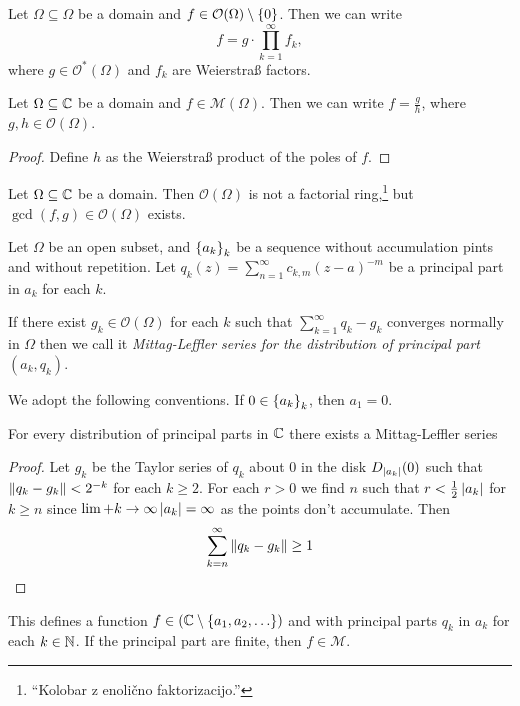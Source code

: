 \begin{izrek}
Let $\Omega \subseteq \Omega$ be a domain and
$f \in \mathcal{O}(\Omega) \setminus \left\{0\right\}$. Then we can write
\[
f = g \cdot \prod_{k=1}^\infty f_k,
\]
where $g \in \mathcal{O}^*(\Omega)$ and $f_k$ are Weierstraß
factors.
\end{izrek}

\obvs

\begin{izrek}
Let $\Omega \subseteq \mathbb{C}$ be a domain and
$f \in \mathcal{M}(\Omega)$. Then we can write $f = \frac{g}{h}$,
where $g, h \in \mathcal{O}(\Omega)$.
\end{izrek}

\begin{proof}
Define $h$ as the Weierstraß product of the poles of $f$.
\end{proof}

\begin{opomba}
Let $\Omega \subseteq \mathbb{C}$ be a domain. Then $\mathcal{O}(\Omega)$
is not a factorial ring,\footnote{``Kolobar z enolično
faktorizacijo.''} but $\gcd(f, g) \in \mathcal{O}(\Omega)$ exists.
\end{opomba}


\begin{definicija}
    Let $\Omega$ be an open subset, and $\left\{a_k\right\}_k$ be a sequence without accumulation pints and without repetition. Let $q_k(z) = \sum_{n=1}^{\infty} c_{k, m} (z - a)^{-m}$ be a principal part in $a_k$ for each $k$.

    If there exist $g_k \in \mathcal{O}(\Omega)$ for each $k$ such that $\sum_{k = 1}^{\infty} q_k - g_k$ converges normally in $\Omega$ then we call it \textit{Mittag-Leffler series for the distribution of principal part $(a_k, q_k)$}.
\end{definicija}
\begin{opomba}
    We adopt the following conventions. If $ 0 \in \left\{a_k\right\}_k$, then $a_1 = 0$.
\end{opomba}

\begin{izrek}
    \label{inf_prod:thr:MLforC}
    For every distribution of principal parts in $\mathbb{C}$ there exists a Mittag-Leffler series
\end{izrek}
\begin{proof}
    Let $g_k$ be the Taylor series of $q_k$ about $0$ in the disk $D_{\left\lvert a_k\right\rvert}(0)$ such that $\left\lVert q_k - g_k\right\rVert < 2^{-k}$ for each $k \geq 2$. For each $r > 0$ we find $n$ such that $r < \frac{1}{2}\left\lvert a_k\right\rvert$ for $k \geq n$ since $\lim+{k \rightarrow \infty} \left\lvert a_k\right\rvert = \infty$ as the points don't accumulate. Then
    $$
        \sum_{k = n}^{\infty} \left\lVert q_k - g_k\right\rVert \geq 1
    $$
\end{proof}
\begin{posledica}
    This defines a function $f \in \mathcal(\mathbb{C} \setminus \left\{a_1, a_2, \ldots\right\})$ and with principal parts $q_k$ in $a_k$ for each $k \in \mathbb{N}$. If the principal part are finite, then $f \in \mathcal{M}$.
\end{posledica}

